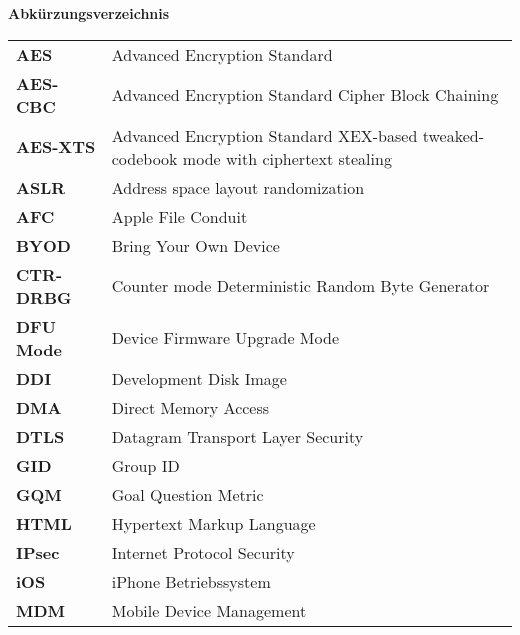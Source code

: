 %
%
% 
% 
% 

\begin{center}
{\Large\bfseries Abkürzungsverzeichnis}
\end{center}

\begin{table*}[htbp]
		 \begin{tabular}{p{3cm}p{12cm}} 
		    \textbf{AES} & Advanced Encryption Standard \\
            \textbf{AES-CBC} & Advanced Encryption Standard Cipher Block Chaining \\
            \textbf{AES-XTS} & Advanced Encryption Standard XEX-based tweaked-codebook mode with ciphertext stealing \\ 
		     \textbf{ASLR} & Address space layout randomization \\
		     \textbf{AFC} & Apple File Conduit\\
		     
		     \textbf{BYOD} & Bring Your Own Device\\
		     
		     \textbf{CTR-DRBG} & Counter mode Deterministic Random Byte Generator \\
		     
		     \textbf{DFU Mode} & Device Firmware Upgrade Mode\\
		     \textbf{DDI} & Development Disk Image \\
		     \textbf{DMA} & Direct Memory Access\\
		     \textbf{DTLS} & Datagram Transport Layer Security \\
		     
		     \textbf{GID} & Group ID \\
		     \textbf{GQM} & Goal Question Metric\\
		     
		     \textbf{HTML} & Hypertext Markup Language \\
		     
		     \textbf{IPsec} & Internet Protocol Security \\
		     \textbf{iOS} & iPhone Betriebssystem\\
		     
		     
		     \textbf{MDM} & Mobile Device Management \\
		     

\end{tabular}
\end{table*}
